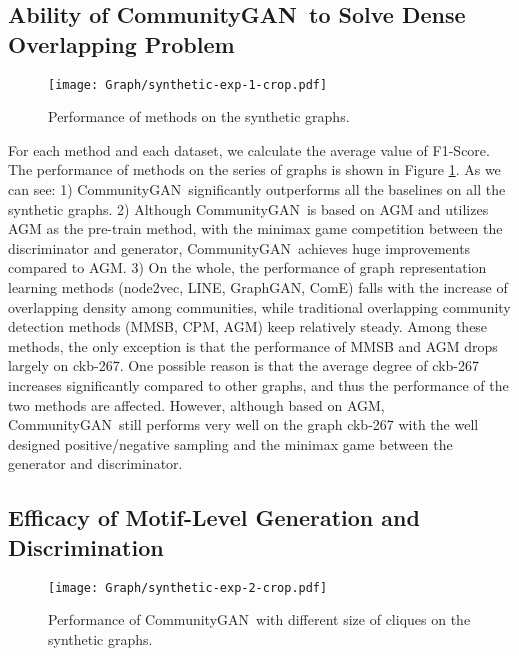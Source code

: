 \documentclass[sigconf]{acmart}
\newcommand{\ComGAN}{CommunityGAN}
\begin{document}
\subsection{Ability of \ComGAN~to Solve Dense Overlapping Problem}

\begin{figure}[tbp]
\texttt{[image: Graph/synthetic-exp-1-crop.pdf]}
\caption{Performance of methods on the synthetic graphs.}
\label{fig:synthetic-data-1}
\end{figure}

For each method and each dataset, we calculate the average value of F1-Score.
The performance of  methods on the series of graphs is shown in Figure \ref{fig:synthetic-data-1}.
As we can see: 
1) \ComGAN~significantly outperforms all the baselines on all the synthetic graphs.
2) Although \ComGAN~is based on AGM and utilizes AGM as the pre-train method, with the minimax game competition between the discriminator and generator, \ComGAN~achieves huge improvements compared to AGM.
3) On the whole, the performance of  graph representation learning methods (node2vec, LINE, GraphGAN, ComE) falls with the increase of overlapping density among communities, while  traditional overlapping community detection methods (MMSB, CPM, AGM) keep relatively steady.
Among these  methods, the only exception is that the performance of MMSB and AGM drops largely on ckb-267.
One possible reason is that the average degree of ckb-267 increases significantly compared to other graphs, and thus the performance of the two methods are affected.
However, although based on AGM, \ComGAN~still performs very well on the graph ckb-267 with the well designed positive/negative sampling and the minimax game between the generator and discriminator.

\subsection{Efficacy of Motif-Level Generation and Discrimination}

\begin{figure}[tbp]
\texttt{[image: Graph/synthetic-exp-2-crop.pdf]}
\caption{Performance of \ComGAN~with different size of cliques on the synthetic graphs.}
\label{fig:synthetic-data-2}
\end{figure}
\end{document}

